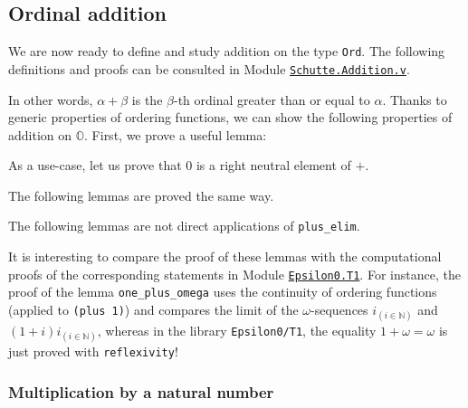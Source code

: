 {\subsection{Ordinal addition}

We are now ready to define and study addition on the type \texttt{Ord}.
The following definitions and proofs can be consulted in Module
\href{../theories/html/hydras.Schutte.Addition.html}%
{\texttt{Schutte.Addition.v}}.




In other words,  $\alpha + \beta$ is the  $\beta$-th ordinal greater than or equal to $\alpha$. 
Thanks to generic properties of ordering functions, we can show the following 
properties of addition on $\mathbb{O}$. First, we prove a useful lemma:



As a use-case, let us prove that $0$ is a right neutral element of $+$.




The following lemmas are proved the same way.




The following lemmas are not direct applications of \texttt{plus\_elim}.



  


It is interesting to compare the proof of these lemmas with the
computational proofs of the corresponding statements in Module
\href{../theories/html/hydras.Epsilon0.T1.html}%
{\texttt{Epsilon0.T1}}. 
For instance, the proof of the lemma 
\texttt{one\_plus\_omega} uses the continuity of ordering functions (applied to  \texttt{(plus 1)}) and compares the limit of the $\omega$-sequences $i_{(i \in \mathbb{N})}$ and
$(1+i)i_{(i \in \mathbb{N})}$, whereas in the library  \texttt{Epsilon0/T1}, the equality 
$1+\omega=\omega$ is just proved with \texttt{reflexivity}!



\subsubsection{Multiplication by a natural number}

}
